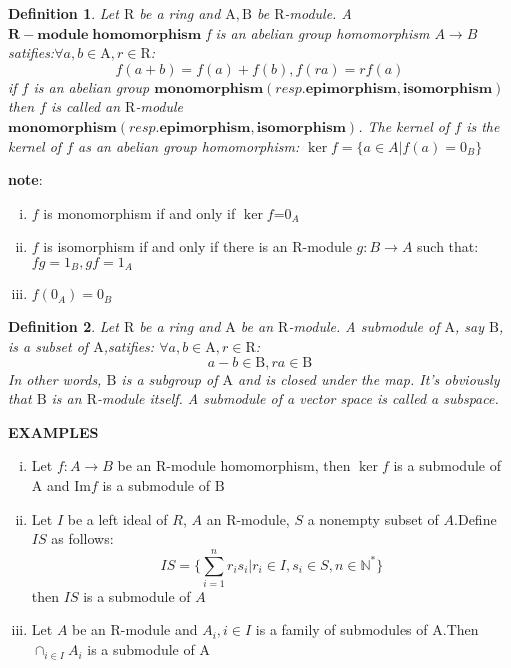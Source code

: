 \documentclass[a4paper]{article}
\newtheorem{myDef}{Definition}
\newcommand{\N}{\mathbb{N}}
\begin{document}
    \begin{myDef}
        Let $\mathrm{R}$ be a ring and $\mathrm{A,B}$ be $\mathrm{R}$-module. A $\mathbf{R-module \;homomorphism}$ f is an abelian group homomorphism
        $A\rightarrow B$ satifies:$\forall a,b\in \mathrm{A},r\in \mathrm{R}$:\\
        $$
        f(a+b)=f(a)+f(b),f(ra)=rf(a)
        $$ 
        if $f$ is an abelian group $\mathbf{monomorphism}(resp.\mathbf{epimorphism,isomorphism})$ then $f$ is called an $\mathrm{R}$-module $\mathbf{monomorphism}(resp.\mathbf{epimorphism,isomorphism})$.
    The kernel of $f$ is the kernel of $f$ as an abelian group homomorphism: $\ker f=\{a\in A|f(a)=0_B\}$
    \end{myDef}
    \noindent
    \textbf{note}:
    \begin{enumerate}[(i)]
        \item $f$ is monomorphism if and only if $\ker f$={$0_A$}
        \item $f$ is isomorphism if and only if there is an R-module $g:B\rightarrow A$ such that:$fg=1_B,gf=1_A$
        \item $f(0_A)=0_B$
    \end{enumerate}
    \vspace{0.5cm}
    \begin{myDef}
        Let $\mathrm{R}$ be a ring and $\mathrm{A}$ be an $\mathrm{R}$-module. A submodule of $\mathrm{A}$, say $\mathrm{B}$, is a subset of $\mathrm{A}$,satifies:
        $\forall a,b\in \mathrm{A}, r\in \mathrm{R}$:
        $$
        a-b\in \mathrm{B},ra\in \mathrm{B}
        $$
        In other words, $\mathrm{B}$ is a subgroup of $\mathrm{A}$ and is closed under the map. It's obviously that $\mathrm{B}$ is an $\mathrm{R}$-module itself. A submodule of a 
        vector space is called a subspace.
    \end{myDef}
    \textbf{EXAMPLES}
    \noindent
    \begin{enumerate}[(i)]
        \item Let $f:A\rightarrow B$ be an $\mathrm{R}$-module homomorphism, then $\ker f$ is a submodule of $\mathrm{A}$ and $\mathrm{Im} f$ is a submodule of $\mathrm{B}$
        \item Let $I$ be a left ideal of $R$, $A$ an $\mathrm{R}$-module, $S$ a nonempty subset of $A$.Define $IS$ as follows:\\
        $$
        IS=\{\sum_{i=1}^nr_is_i|r_i\in I, s_i\in S, n\in \N^{*}\}
        $$
        then $IS$ is a submodule of $A$
        \item Let $A$ be an $\mathrm{R}$-module and $A_i,i\in I$ is a family of submodules of $\mathrm{A}$.Then $\cap_{i\in I}A_i$ is a submodule of $\mathrm{A}$
    \end{enumerate}
\end{document}
